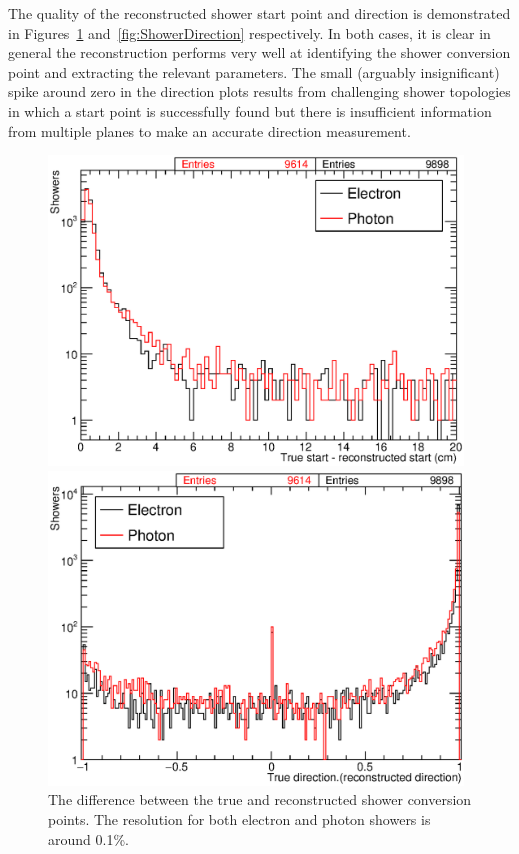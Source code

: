The quality of the reconstructed shower start point and direction is demonstrated in Figures~\ref{fig:ShowerStart} and~\ref{fig:ShowerDirection} respectively.  In both cases, it is clear in general the reconstruction performs very well at identifying the shower conversion point and extracting the relevant parameters.  The small (arguably insignificant) spike around zero in the direction plots results from challenging shower topologies in which a start point is successfully found but there is insufficient information from multiple planes to make an accurate direction measurement.

\begin{figure}
  \begin{minipage}[t]{0.48\linewidth}
    \centering
    \includegraphics[width=0.98\textwidth]{ShowerStart.eps}
    \caption[The difference between the true and reconstructed shower conversion points.]{The difference between the true and reconstructed shower conversion points.  The resolution for both electron and photon showers is around 0.1\%.}
    \label{fig:ShowerStart}
  \end{minipage}
  \hfill
  \begin{minipage}[t]{0.48\linewidth}
    \centering
    \includegraphics[width=0.98\textwidth]{ShowerDirection.eps}

\end{minipage}
\end{figure}
